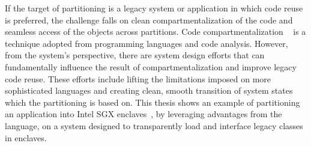 
If the target of partitioning is a legacy system or application
in which code reuse is preferred,
the challenge falls on
clean compartmentalization of the code
and seamless access of the objects across partitions.
Code compartmentalization
~\citep{addistant, jorchestra, jif-split, swift}
is a technique adopted from
programming languages and code analysis.
However, from the system's perspective,
there are system design efforts that
can fundamentally influence the result of compartmentalization
and improve legacy code reuse.
These efforts include
lifting the limitations imposed on more sophisticated languages
and creating clean, smooth transition of system states
which the partitioning is based on.
This thesis shows an example of partitioning an application
into Intel SGX enclaves~\citep{intelsgx},
by leveraging advantages from the \java{} language,
on a system designed to transparently load and interface legacy \java{} classes in enclaves.


